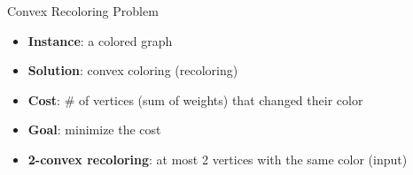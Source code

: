 \begin{frame}{Convex Recoloring Problem}
\begin{itemize}


\item
\textbf{Instance}: a colored graph

\pause\item
\textbf{Solution}: convex coloring (recoloring)

\pause\item
\textbf{Cost}: \# of vertices {\tiny(sum of weights)} that changed their color

\pause\item
\textbf{Goal}: minimize the cost


\end{itemize}
\pause

\begin{itemize}
\pause\item
{\small\textbf{2-convex recoloring}: at most 2 vertices with the same color (input)} 
\end{itemize}


\end{frame}
